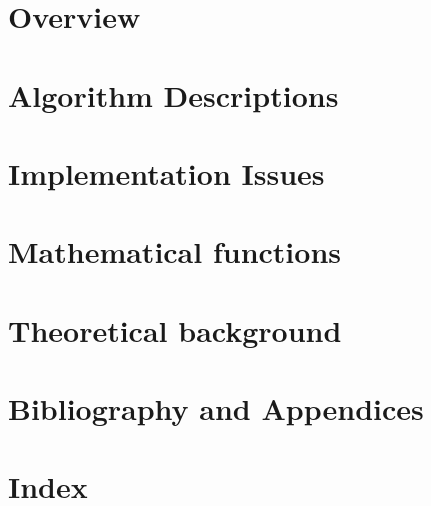 %
%
\part{Overview}



%
\part{Algorithm Descriptions}











%
%
%
% 
%
\part{Implementation Issues}


%
\part{Mathematical functions}




%
\part{Theoretical background}


%
%
%
%
\part{Bibliography and Appendices}

%
\part{Index}
\printindex






